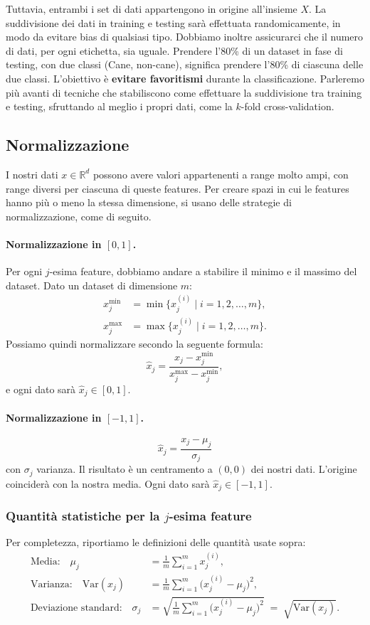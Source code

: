 Tuttavia, entrambi i set di dati appartengono in origine all'insieme $X$. La suddivisione dei dati in training e testing sarà effettuata randomicamente, in modo da evitare bias di qualsiasi tipo. Dobbiamo inoltre assicurarci che il numero di dati, per ogni etichetta, sia uguale. Prendere l'80\% di un dataset in fase di testing, con due classi (Cane, non-cane), significa prendere l'80\% di ciascuna delle due classi. L'obiettivo è \textbf{evitare favoritismi} durante la classificazione. Parleremo più avanti di tecniche che stabiliscono come effettuare la suddivisione tra training e testing, sfruttando al meglio i propri dati, come la $k$-fold cross-validation.


\subsection{Normalizzazione}

I nostri dati $x \in \mathbb{R}^d$ possono avere valori appartenenti a range molto ampi, con range diversi per ciascuna di queste features. Per creare spazi in cui le features hanno più o meno la stessa dimensione, si usano delle strategie di normalizzazione, come di seguito.

\paragraph{Normalizzazione in $[0,1]$.}
Per ogni $j$-esima feature, dobbiamo andare a stabilire il minimo e il massimo del dataset. Dato un dataset di dimensione $m$:
\begin{align*}
  x_j^{\min } &= \min\{x_j^{(i)} \mid i = 1, 2, \dots, m\},\\
  x_j^{\max } &= \max\{x_j^{(i)} \mid i = 1, 2, \dots, m\}.
\end{align*}
Possiamo quindi normalizzare secondo la seguente formula:
\[
  \hat{x}_j = \frac{x_j - x_j^{\min}}{x_j^{\max} - x_j^{\min}},
\]
e ogni dato sarà $\hat{x}_j \in [0,1]$.

\paragraph{Normalizzazione in $[-1,1]$.}
\[
  \hat{x}_j = \frac{x_j - \mu_j}{\sigma_j}
\]
con $\sigma_j$ varianza. Il risultato è un centramento a $(0,0)$ dei nostri dati. L'origine coinciderà con la nostra media. Ogni dato sarà $\hat{x}_j \in [-1,1]$.

\subsubsection*{Quantità statistiche per la $j$-esima feature}
Per completezza, riportiamo le definizioni delle quantità usate sopra:
\begin{align*}
  \text{Media:}\quad
  \mu_j &= \frac{1}{m}\sum_{i=1}^m x_j^{(i)},\\[4pt]
  \text{Varianza:}\quad
  \mathrm{Var}(x_j) &= \frac{1}{m}\sum_{i=1}^m \bigl(x_j^{(i)}-\mu_j\bigr)^2,\\[4pt]
  \text{Deviazione standard:}\quad
  \sigma_j &= \sqrt{\frac{1}{m}\sum_{i=1}^m \bigl(x_j^{(i)}-\mu_j\bigr)^2}
           \;=\; \sqrt{\mathrm{Var}(x_j)}.
\end{align*}

